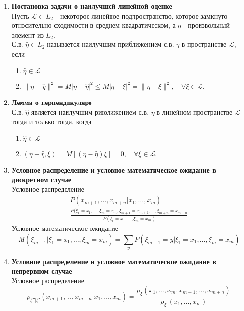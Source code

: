 \documentclass[A4]{article}
\begin{document}
\begin{enumerate}
	\item \textbf{Постановка задачи о наилучшей линейной оценке}\\
	Пусть $\mathcal{L}\subset L_2$ - некоторое линейное подпространство, которое замкнуто относительно сходимости в среднем квадратическом, а $\eta$ - произвольный элемент из $L_2$.\\
	С.в. $\hat{\eta}\in L_2$ называется наилучшим приближением с.в. $\eta$ в пространстве $\mathcal{L}$, если 
	\begin{enumerate}
		\item $\hat{\eta}\in\mathcal{L}$
		\item $\|\eta-\hat{\eta}\|^2=M|\eta-\hat{\eta}|^2\le M|\eta-\xi|^2=\|\eta-\xi\|^2,\quad\forall\xi\in\mathcal{L}$.
	\end{enumerate}
	\item \textbf{Лемма о перпендикуляре}\\
	С.в. $\hat{\eta}$ является наилучшим риюлижением с.в. $\eta$ в линейном пространстве $\mathcal{L}$ тогда и только тогда, когда
	\begin{enumerate}
		\item $\hat{\eta}\in\mathcal{L}$
		\item $(\eta-\hat{\eta},\xi)=M[(\eta-\hat{\eta})\xi]=0,\quad\forall\xi\in\mathcal{L}$.
	\end{enumerate}
	\item \textbf{Условное распределение  и условное математическое ожидание в дискретном случае}\\
	Условное распределение 
	\begin{equation}
	\begin{split}
	P(x_{m+1},\ldots,x_{m+n}|x_1,\ldots,x_m)=\\
	\frac{P(\xi_1=x_1,\ldots,\xi_m=x_m,\xi_{m+1} =x_{m+1},\ldots,\xi_{m+n}=x_{m+n}}{P(\xi_1=x_1,\ldots,\xi_m=x_m)}
	\end{split}
	\end{equation}
	Условное математическое ожидание
	\begin{equation}
	M(\xi_{m+1}|\xi_1=x_1,\ldots,\xi_m=x_m)=\sum_{y}P(\xi_{m+1}=y|\xi_1=x_1,\ldots,\xi_m=x_m)
	\end{equation}
	\item \textbf{Условное распределение  и условное математическое ожидание в непрервном случае}\\
	Условное распределение 
	\begin{equation}
	\rho_{\xi''|\xi'}(x_{m+1},\ldots,x_{m+n}|x_1,\ldots,x_m)=
	\frac{\rho_{\xi}(x_1,\ldots,x_m,x_{m+1},\ldots,x_{m+n})}{\rho_{\xi'}(x_1,\ldots,x_m)}

\end{equation}
\end{enumerate}
\end{document}
